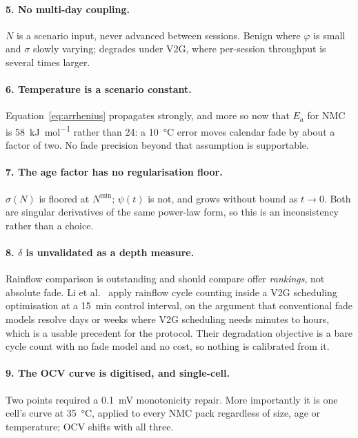 \documentclass[11pt,a4paper]{article}
\begin{document}
\paragraph{5. No multi-day coupling.}
$N$ is a scenario input, never advanced between sessions. Benign where
$\varphi$ is small and $\sigma$ slowly varying; degrades under V2G,
where per-session throughput is several times larger.

\paragraph{6. Temperature is a scenario constant.}
Equation~\eqref{eq:arrhenius} propagates strongly, and more so now that
$E_a$ for NMC is \SI{58}{\kilo\joule\per\mole} rather than
\num{24}: a \SI{10}{\celsius} error moves calendar fade by about a
factor of two. No fade precision beyond that assumption is supportable.

\paragraph{7. The age factor has no regularisation floor.}
$\sigma(N)$ is floored at $N^{\min}$; $\psi(t)$ is not, and grows
without bound as $t \to 0$. Both are singular derivatives of the same
power-law form, so this is an inconsistency rather than a choice.

\paragraph{8. $\delta$ is unvalidated as a depth measure.}
Rainflow comparison is outstanding and should compare offer
\emph{rankings}, not absolute fade. Li et al.~\cite{li2020} apply
rainflow cycle counting inside a V2G scheduling optimisation at a
\SI{15}{\minute} control interval, on the argument that conventional
fade models resolve days or weeks where V2G scheduling needs minutes
to hours, which is a usable precedent for the protocol. Their
degradation objective is a bare cycle count with no fade model and no
cost, so nothing is calibrated from it.

\paragraph{9. The OCV curve is digitised, and single-cell.}
Two points required a \SI{0.1}{\milli\volt} monotonicity repair. More
importantly it is one cell's curve at \SI{35}{\celsius}, applied to
every NMC pack regardless of size, age or temperature; OCV shifts with
all three.
\end{document}
